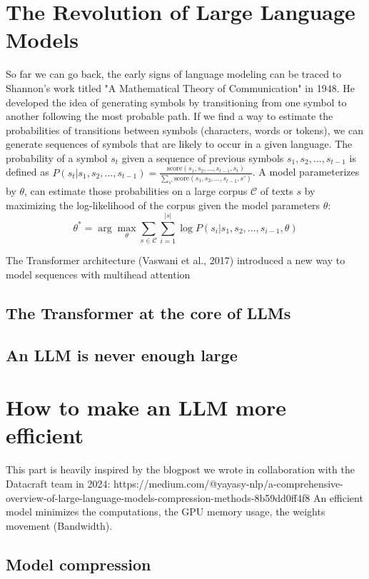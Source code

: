 \section{The Revolution of Large Language Models}
So far we can go back, the early signs of language modeling can be traced to Shannon's work titled "A Mathematical Theory of Communication" in 1948. He developed the idea of generating symbols by transitioning from one symbol to another following the most probable path.
If we find a way to estimate the probabilities of transitions between symbols (characters, words or tokens), we can generate sequences of symbols that are likely to occur in a given language. The probability of a symbol $s_t$ given a sequence of previous symbols $s_1, s_2, ..., s_{t-1}$ is defined as $P(s_t | s_1, s_2, ..., s_{t-1}) = \frac{\text{score}(s_1, s_2, ..., s_{t-1}, s_t)}{\sum_{s'} \text{score}(s_1, s_2, ..., s_{t-1}, s')}$.
A model parameterizes by $\theta$, can estimate those probabilities on a large corpus $\mathcal{C}$ of texts $s$ by maximizing the log-likelihood of the corpus given the model parameters $\theta$:
\begin{equation}
\theta^* = \arg\max_\theta \sum_{s \in \mathcal{C}} \sum_{i=1}^{|s|} \log P(s_i | s_1, s_2, ..., s_{i-1}, \theta)
\end{equation}

The Transformer architecture (Vaswani et al., 2017) introduced a new way to model sequences with multihead attention
\subsection{The Transformer at the core of LLMs}
\subsection{An LLM is never enough large}
\section{How to make an LLM more efficient}
This part is heavily inspired by the blogpost we wrote in collaboration with the Datacraft team in 2024: https://medium.com/@yayasy-nlp/a-comprehensive-overview-of-large-language-models-compression-methods-8b59dd0ff4f8
An efficient model minimizes the computations, the GPU memory usage, the weights movement (Bandwidth).
\subsection{Model compression}
